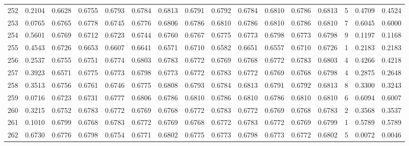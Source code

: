 \begin{tabular}{lrrrrrrrrrrrrrrr}
252 &      0.2104 &  0.6628 &  0.6755 &  0.6793 &  0.6784 &  0.6813 &  0.6791 &  0.6792 &  0.6784 &  0.6810 &   0.6786 &     0.6813 &      5 &                    0.4709 &                     0.4524 \\
253 &      0.0765 &  0.6765 &  0.6778 &  0.6745 &  0.6776 &  0.6806 &  0.6786 &  0.6810 &  0.6786 &  0.6810 &   0.6786 &     0.6810 &      7 &                    0.6045 &                     0.6000 \\
254 &      0.5601 &  0.6769 &  0.6712 &  0.6723 &  0.6744 &  0.6760 &  0.6767 &  0.6775 &  0.6773 &  0.6798 &   0.6773 &     0.6798 &      9 &                    0.1197 &                     0.1168 \\
255 &      0.4543 &  0.6726 &  0.6653 &  0.6607 &  0.6641 &  0.6571 &  0.6710 &  0.6582 &  0.6651 &  0.6557 &   0.6710 &     0.6726 &      1 &                    0.2183 &                     0.2183 \\
256 &      0.2537 &  0.6755 &  0.6751 &  0.6774 &  0.6803 &  0.6783 &  0.6772 &  0.6769 &  0.6768 &  0.6772 &   0.6783 &     0.6803 &      4 &                    0.4266 &                     0.4218 \\
257 &      0.3923 &  0.6571 &  0.6775 &  0.6773 &  0.6798 &  0.6773 &  0.6772 &  0.6783 &  0.6772 &  0.6769 &   0.6768 &     0.6798 &      4 &                    0.2875 &                     0.2648 \\
258 &      0.3513 &  0.6756 &  0.6761 &  0.6746 &  0.6775 &  0.6808 &  0.6793 &  0.6784 &  0.6813 &  0.6791 &   0.6792 &     0.6813 &      8 &                    0.3300 &                     0.3243 \\
259 &      0.0716 &  0.6723 &  0.6731 &  0.6777 &  0.6806 &  0.6786 &  0.6810 &  0.6786 &  0.6810 &  0.6786 &   0.6810 &     0.6810 &      6 &                    0.6094 &                     0.6007 \\
260 &      0.3215 &  0.6752 &  0.6783 &  0.6772 &  0.6769 &  0.6768 &  0.6772 &  0.6783 &  0.6772 &  0.6769 &   0.6768 &     0.6783 &      2 &                    0.3568 &                     0.3537 \\
261 &      0.1010 &  0.6799 &  0.6768 &  0.6783 &  0.6772 &  0.6769 &  0.6768 &  0.6772 &  0.6783 &  0.6772 &   0.6769 &     0.6799 &      1 &                    0.5789 &                     0.5789 \\
262 &      0.6730 &  0.6776 &  0.6798 &  0.6754 &  0.6771 &  0.6802 &  0.6775 &  0.6773 &  0.6798 &  0.6773 &   0.6772 &     0.6802 &      5 &                    0.0072 &                     0.0046 \\

\end{tabular}
